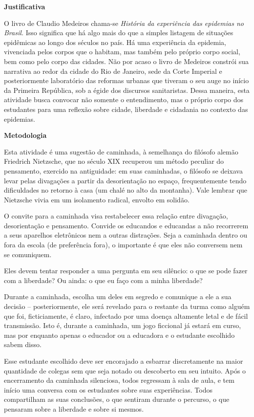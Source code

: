\documentclass[12pt]{extarticle}
\begin{document}
\textbf{Justificativa}

O livro de Claudio Medeiros chama-se \emph{História da experiência das
epidemias no Brasil.} Isso significa que há algo mais do que a simples
listagem de situações epidêmicas ao longo dos séculos no país. Há uma
experiência da epidemia, vivenciada pelos corpos que o habitam, mas
também pelo próprio corpo social, bem como pelo corpo das cidades. Não
por acaso o livro de Medeiros constrói sua narrativa ao redor da cidade
do Rio de Janeiro, sede da Corte Imperial e posteriormente laboratório
das reformas urbanas que tiveram o seu auge no início da Primeira
República, sob a égide dos discursos sanitaristas. Dessa maneira, esta
atividade busca convocar não somente o entendimento, mas o próprio corpo
dos estudantes para uma reflexão sobre cidade, liberdade e cidadania no
contexto das epidemias.

\textbf{Metodologia}

Esta atividade é uma sugestão de caminhada, à semelhança do filósofo
alemão Friedrich Nietzsche, que no século XIX recuperou um método
peculiar do pensamento, exercido na antiguidade: em suas caminhadas, o
filósofo se deixava levar pelas divagações a partir da desorientação no
espaço, frequentemente tendo dificuldades no retorno à casa (um chalé no
alto da montanha). Vale lembrar que Nietzsche vivia em um isolamento
radical, envolto em solidão.

O convite para a caminhada visa restabelecer essa relação entre
divagação, desorientação e pensamento. Convide os educandos e educandas
a não recorrerem a seus aparelhos eletrônicos nem a outras distrações.
Seja a caminhada dentro ou fora da escola (de preferência fora), o
importante é que eles não conversem nem se comuniquem.

Eles devem tentar responder a uma pergunta em seu silêncio: o que se
pode fazer com a liberdade? Ou ainda: o que eu faço com a minha
liberdade?

Durante a caminhada, escolha um deles em segredo e comunique a ele a sua
decisão -- posteriormente, ele será revelado para o restante da turma
como alguém que foi, ficticiamente, é claro, infectado por uma doença
altamente letal e de fácil transmissão. Isto é, durante a caminhada, um
jogo ficcional já estará em curso, mas por enquanto apenas o educador ou
a educadora e o estudante escolhido sabem disso.

Esse estudante escolhido deve ser encorajado a esbarrar discretamente na
maior quantidade de colegas sem que seja notado ou descoberto em seu
intuito. Após o encerramento da caminhada silenciosa, todos regressam à
sala de aula, e tem início uma conversa com os estudantes sobre suas
experiências. Todos compartilham as suas conclusões, o que sentiram
durante o percurso, o que pensaram sobre a liberdade e sobre si mesmos.
\end{document}
